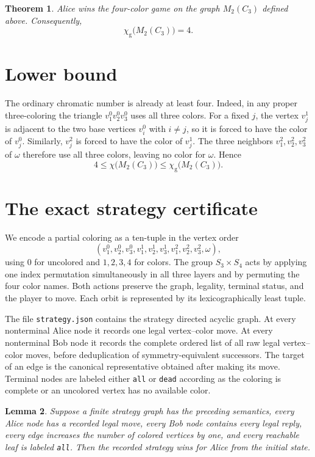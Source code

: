 \documentclass[11pt]{article}
\newtheorem{theorem}{Theorem}
\newtheorem{lemma}[theorem]{Lemma}
\newcommand{\gamechi}{\chi_{\mathrm g}}
\begin{document}
\begin{theorem}\label{thm:main}
Alice wins the four-color game on the graph $M_2(C_3)$ defined above.
Consequently,
\[
  \gamechi\bigl(M_2(C_3)\bigr)=4.
\]
\end{theorem}

\section{Lower bound}

The ordinary chromatic number is already at least four.  Indeed, in any
proper three-coloring the triangle $v_1^0v_2^0v_3^0$ uses all three colors.
For a fixed $j$, the vertex $v_j^1$ is adjacent to the two base vertices
$v_i^0$ with $i\neq j$, so it is forced to have the color of $v_j^0$.
Similarly, $v_j^2$ is forced to have the color of $v_j^1$.  The three
neighbors $v_1^2,v_2^2,v_3^2$ of $\omega$ therefore use all three colors,
leaving no color for $\omega$.  Hence
\[
  4\leq\chi\bigl(M_2(C_3)\bigr)
  \leq\gamechi\bigl(M_2(C_3)\bigr).
\]

\section{The exact strategy certificate}

We encode a partial coloring as a ten-tuple in the vertex order
\[
(v_1^0,v_2^0,v_3^0,v_1^1,v_2^1,v_3^1,
  v_1^2,v_2^2,v_3^2,\omega),
\]
using $0$ for uncolored and $1,2,3,4$ for colors.  The group
$S_3\times S_4$ acts by applying one index permutation simultaneously in all
three layers and by permuting the four color names.  Both actions preserve
the graph, legality, terminal status, and the player to move.  Each orbit is
represented by its lexicographically least tuple.

The file \texttt{strategy.json} contains the strategy directed acyclic graph.
At every nonterminal Alice node it records one legal vertex--color move.  At
every nonterminal Bob node it records the complete ordered list of all raw
legal vertex--color moves, before deduplication of symmetry-equivalent
successors.  The target of an edge is the canonical representative obtained
after making its move.  Terminal nodes are labeled either \texttt{all} or
\texttt{dead} according as the coloring is complete or an uncolored vertex
has no available color.

\begin{lemma}\label{lem:certificate}
Suppose a finite strategy graph has the preceding semantics, every Alice node
has a recorded legal move, every Bob node contains every legal reply, every
edge increases the number of colored vertices by one, and every reachable
leaf is labeled \texttt{all}.  Then the recorded strategy wins for Alice from
the initial state.
\end{lemma}
\end{document}
